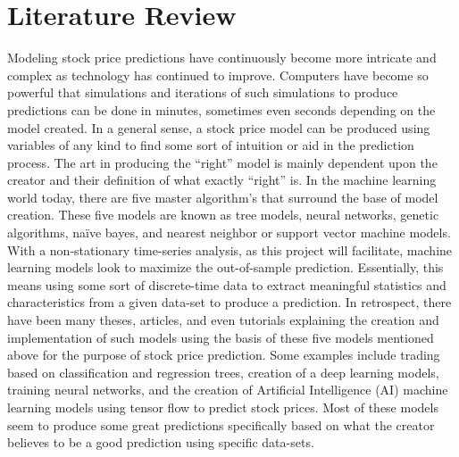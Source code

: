 \documentclass{article}
\begin{document}
\newpage
\section{Literature Review}
Modeling stock price predictions have continuously become more intricate and complex as technology has continued to improve. Computers have become so powerful that simulations and iterations of such simulations to produce predictions can be done in minutes, sometimes even seconds depending on the model created. In a general sense, a stock price model can be produced using variables of any kind to find some sort of intuition or aid in the prediction process. The art in producing the “right” model is mainly dependent upon the creator and their definition of what exactly “right” is. In the machine learning world today, there are five master algorithm’s that surround the base of model creation. These five models are known as tree models, neural networks, genetic algorithms, naïve bayes, and nearest neighbor or support vector machine models. With a non-stationary time-series analysis, as this project will facilitate, machine learning models look to maximize the out-of-sample prediction. Essentially, this means using some sort of discrete-time data to extract meaningful statistics and characteristics from a given data-set to produce a prediction. In retrospect, there have been many theses, articles, and even tutorials explaining the creation and implementation of such models using the basis of these five models mentioned above for the purpose of stock price prediction. Some examples include trading based on classification and regression trees, creation of a deep learning models, training neural networks, and the creation of Artificial Intelligence (AI) machine learning models using tensor flow to predict stock prices. Most of these models seem to produce some great predictions specifically based on what the creator believes to be a good prediction using specific data-sets.
\end{document}
